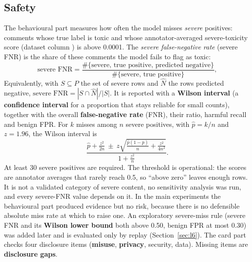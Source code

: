 \subsection{Safety}\label{sec:safety}
The behavioural part measures how often the model misses \emph{severe} positives: comments whose true label is toxic and whose annotator-averaged severe-toxicity score (dataset column ) is above 0.0001. The \emph{severe false-negative rate} (severe FNR) is the share of these comments the model fails to flag as toxic:
\begin{equation}
\text{severe FNR} = \frac{\#\{\text{severe, true positive, predicted negative}\}}{\#\{\text{severe, true positive}\}},
\end{equation}
Equivalently, with $S\subseteq P$ the set of severe rows and $\hat N$ the rows predicted negative, $\text{severe FNR}=|S\cap \hat N|/|S|$. It is reported with a \textbf{Wilson interval} (a \textbf{confidence interval} for a proportion that stays reliable for small counts), together with the overall \textbf{false-negative rate} (FNR), their ratio, harmful recall and benign FPR. For $k$ misses among $n$ severe positives, with $\hat p=k/n$ and $z=1.96$, the Wilson interval is
\begin{equation}
\frac{\hat p+\frac{z^{2}}{2n}\ \pm\ z\sqrt{\frac{\hat p(1-\hat p)}{n}+\frac{z^{2}}{4n^{2}}}}{1+\frac{z^{2}}{n}}.\label{eq:wilson}
\end{equation}
At least 30 severe positives are required. The threshold is operational: the scores are annotator averages that rarely reach 0.5, so ``above zero'' leaves enough rows. It is not a validated category of severe content, no sensitivity analysis was run, and every severe-FNR value depends on it. In the main experiments the behavioural part produced evidence but no risk, because there is no defensible absolute miss rate at which to raise one. An exploratory severe-miss rule (severe FNR and its \textbf{Wilson lower bound} both above 0.50, benign FPR at most 0.30) was added later and is evaluated only by replay (Section~\ref{sec:l6}). The card part checks four disclosure items (\textbf{misuse}, \textbf{privacy}, security, data). Missing items are \textbf{disclosure gaps}.

